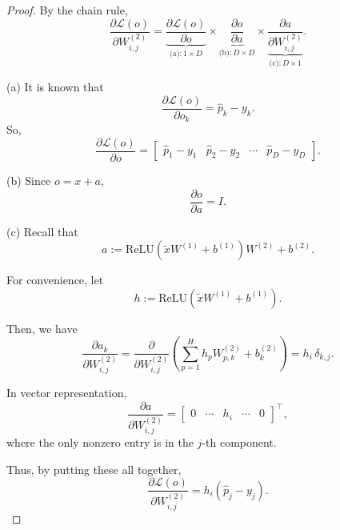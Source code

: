\documentclass{article}
\begin{document}
\begin{proof}
By the chain rule,
\begin{equation}
\frac{\partial \mathcal{L}(o)}{\partial W_{i,j}^{(2)}} = 
    \underbrace{\frac{\partial \mathcal{L}(o)}{\partial o}}_{\text{(a)}: 1 \times D} \times 
    \underbrace{\frac{\partial o}{\partial a}}_{\text{(b)}: D \times D} \times 
    \underbrace{\frac{\partial a}{\partial W_{i,j}^{(2)}}}_{\text{(c)}: D \times 1}.    
\end{equation}

(a) It is known that 
\begin{equation}
    \frac{\partial \mathcal{L}(o)}{\partial o_{k}} = \hat{p}_{k} - y_{k}.
\end{equation}
So,
\begin{equation}
\frac{\partial \mathcal{L}(o)}{\partial o} =   
\begin{bmatrix}
    \hat{p}_{1} - y_{1} & \hat{p}_{2} - y_{2} & \cdots & \hat{p}_{D} - y_{D}
    \end{bmatrix}.
\end{equation}

(b) Since $o = x + a$,
\begin{equation}
    \frac{\partial o}{\partial a} = I.
\end{equation}

(c) Recall that 
\begin{equation}
    a := \mathrm{ReLU}(\tilde{x} W^{(1)} + b^{(1)}) W^{(2)} + b^{(2)}.
\end{equation}

For convenience, let
\begin{equation}
    h := \mathrm{ReLU}(\tilde{x} W^{(1)} + b^{(1)}).
\end{equation}

Then, we have
\begin{equation}
    \frac{\partial a_{k}}{\partial W_{i,j}^{(2)}} = 
    \frac{\partial}{\partial W_{i,j}^{(2)}} 
    \left( \sum_{p=1}^{H} h_{p} W_{p,k}^{(2)} + b_{k}^{(2)} \right) = h_{i} \, \delta_{k,j}.
\end{equation}

In vector representation,
\begin{equation}
    \frac{\partial a}{\partial W_{i,j}^{(2)}} =
    \begin{bmatrix}
    0 & \cdots & h_{i} & \cdots & 0
    \end{bmatrix}^\top,
\end{equation}
where the only nonzero entry is in the $j$-th component.

Thus, by putting these all together,
\begin{equation}
    \frac{\partial \mathcal{L}(o)}{\partial W_{i,j}^{(2)}} = h_{i} (\hat{p}_{j} - y_{j}).    
\end{equation}
\end{proof}
\end{document}

